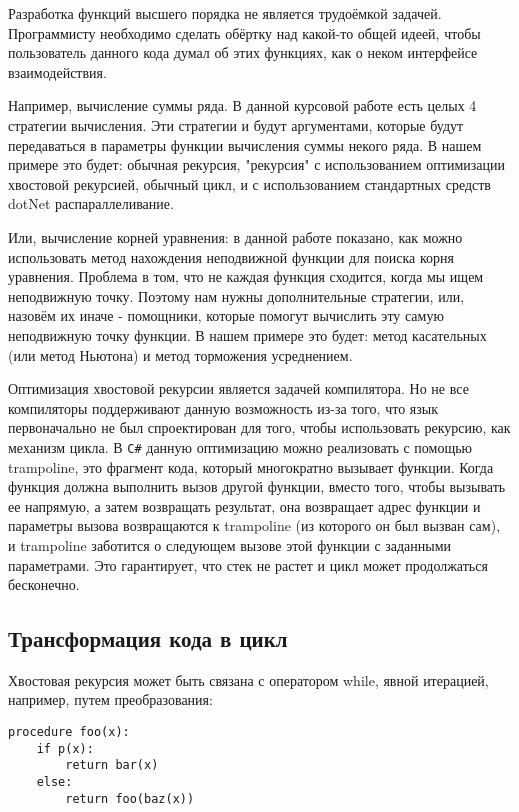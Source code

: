 Разработка функций высшего порядка не является трудоёмкой задачей. 
Программисту необходимо сделать обёртку над какой-то общей идеей, чтобы пользователь данного кода думал об этих функциях, как о неком интерфейсе взаимодействия.

Например, вычисление суммы ряда. В данной курсовой работе есть целых 4 стратегии вычисления. Эти стратегии и будут аргументами, которые будут передаваться в параметры функции вычисления суммы некого ряда.
В нашем примере это будет: обычная рекурсия, "рекурсия" с использованием оптимизации хвостовой рекурсией, обычный цикл, и с использованием стандартных средств dotNet распараллеливание.

Или, вычисление корней уравнения: в данной работе показано, как можно использовать метод нахождения неподвижной функции для поиска корня уравнения.
Проблема в том, что не каждая функция сходится, когда мы ищем неподвижную точку.
Поэтому нам нужны дополнительные стратегии, или, назовём их иначе - помощники, которые помогут вычислить эту самую неподвижную точку функции.
В нашем примере это будет: метод касательных (или метод Ньютона) и метод торможения усреднением.

Оптимизация хвостовой рекурсии является задачей компилятора.
Но не все компиляторы поддерживают данную возможность из-за того, что язык первоначально не был спроектирован для того, чтобы использовать рекурсию, как механизм цикла.
В \texttt{C\#} данную оптимизацию можно реализовать с помощью trampoline, это фрагмент кода, который многократно вызывает функции. 
Когда функция должна выполнить вызов другой функции, вместо того, чтобы вызывать ее напрямую, а затем возвращать результат, она возвращает адрес функции и параметры вызова возвращаются к trampoline (из которого он был вызван сам), и trampoline заботится о следующем вызове этой функции с заданными параметрами. Это гарантирует, что стек не растет и цикл может продолжаться бесконечно.

\subsection{Трансформация кода в цикл}
\label{transformation}

Хвостовая рекурсия может быть связана с оператором while, явной итерацией, например, путем преобразования:

\begin{verbatim}
procedure foo(x):
	if p(x):
		return bar(x)
	else:
		return foo(baz(x))
\end{verbatim}

